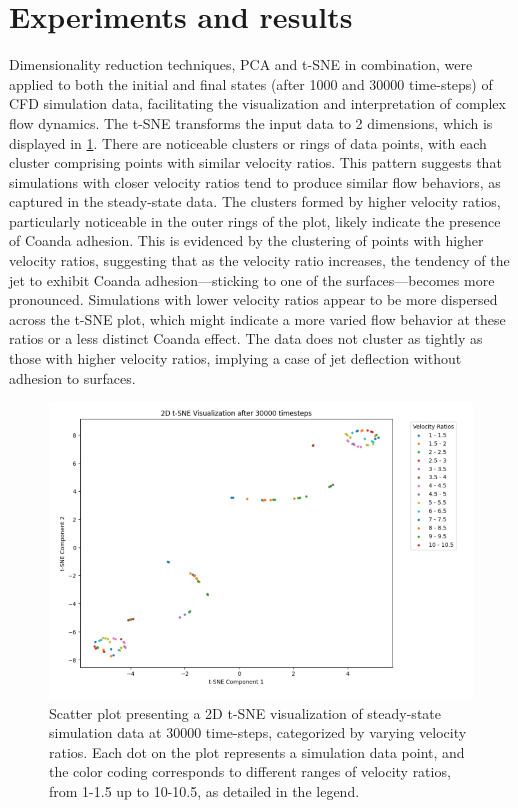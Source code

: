 \section{Experiments and results}
Dimensionality reduction techniques, PCA and t-SNE in combination, were applied to both the initial and final states (after 1000 and 30000 time-steps) of CFD simulation data, facilitating the visualization and interpretation of complex flow dynamics. The t-SNE transforms the input data to 2 dimensions, which is displayed in \ref{tsne}. There are noticeable clusters or rings of data points, with each cluster comprising points with similar velocity ratios. This pattern suggests that simulations with closer velocity ratios tend to produce similar flow behaviors, as captured in the steady-state data. The clusters formed by higher velocity ratios, particularly noticeable in the outer rings of the plot, likely indicate the presence of Coanda adhesion. This is evidenced by the clustering of points with higher velocity ratios, suggesting that as the velocity ratio increases, the tendency of the jet to exhibit Coanda adhesion—sticking to one of the surfaces—becomes more pronounced. Simulations with lower velocity ratios appear to be more dispersed across the t-SNE plot, which might indicate a more varied flow behavior at these ratios or a less distinct Coanda effect. The data does not cluster as tightly as those with higher velocity ratios, implying a case of jet deflection without adhesion to surfaces. 

\begin{figure}[ht]
    \centering
    \includegraphics[width=15cm]{images/Clustering/tsne.png}
    \caption{Scatter plot presenting a 2D t-SNE visualization of steady-state simulation data at 30000 time-steps, categorized by varying velocity ratios. Each dot on the plot represents a simulation data point, and the color coding corresponds to different ranges of velocity ratios, from 1-1.5 up to 10-10.5, as detailed in the legend.}
    \label{tsne}
    \end{figure}

